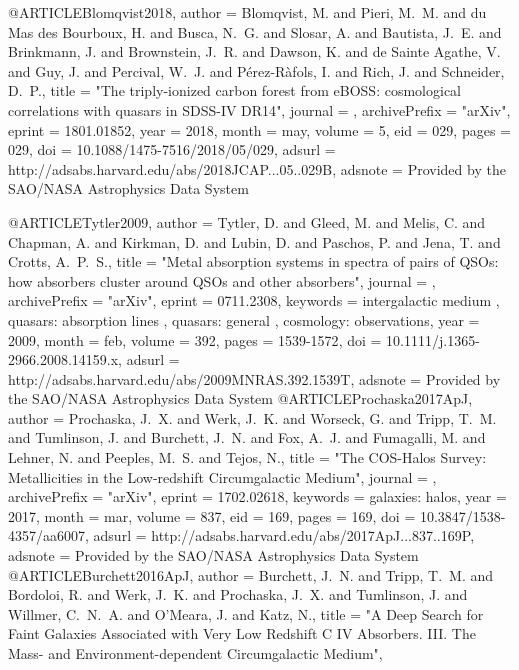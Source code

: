 \documentclass{aa}
\begin{document}
{{{{{{{{{{{{{{@ARTICLE{Blomqvist2018,
   author = {{Blomqvist}, M. and {Pieri}, M.~M. and {du Mas des Bourboux}, H. and 
	{Busca}, N.~G. and {Slosar}, A. and {Bautista}, J.~E. and {Brinkmann}, J. and 
	{Brownstein}, J.~R. and {Dawson}, K. and {de Sainte Agathe}, V. and 
	{Guy}, J. and {Percival}, W.~J. and {P{\'e}rez-R{\`a}fols}, I. and 
	{Rich}, J. and {Schneider}, D.~P.},
    title = "{The triply-ionized carbon forest from eBOSS: cosmological correlations with quasars in SDSS-IV DR14}",
  journal = {\jcap},
archivePrefix = "arXiv",
   eprint = {1801.01852},
     year = 2018,
    month = may,
   volume = 5,
      eid = {029},
    pages = {029},
      doi = {10.1088/1475-7516/2018/05/029},
   adsurl = {http://adsabs.harvard.edu/abs/2018JCAP...05..029B},
  adsnote = {Provided by the SAO/NASA Astrophysics Data System}
}

@ARTICLE{Tytler2009,
   author = {{Tytler}, D. and {Gleed}, M. and {Melis}, C. and {Chapman}, A. and 
	{Kirkman}, D. and {Lubin}, D. and {Paschos}, P. and {Jena}, T. and 
	{Crotts}, A.~P.~S.},
    title = "{Metal absorption systems in spectra of pairs of QSOs: how absorbers cluster around QSOs and other absorbers}",
  journal = {\mnras},
archivePrefix = "arXiv",
   eprint = {0711.2308},
 keywords = {intergalactic medium , quasars: absorption lines , quasars: general , cosmology: observations},
     year = 2009,
    month = feb,
   volume = 392,
    pages = {1539-1572},
      doi = {10.1111/j.1365-2966.2008.14159.x},
   adsurl = {http://adsabs.harvard.edu/abs/2009MNRAS.392.1539T},
  adsnote = {Provided by the SAO/NASA Astrophysics Data System}
}
@ARTICLE{Prochaska2017ApJ,
   author = {{Prochaska}, J.~X. and {Werk}, J.~K. and {Worseck}, G. and {Tripp}, T.~M. and 
	{Tumlinson}, J. and {Burchett}, J.~N. and {Fox}, A.~J. and {Fumagalli}, M. and 
	{Lehner}, N. and {Peeples}, M.~S. and {Tejos}, N.},
    title = "{The COS-Halos Survey: Metallicities in the Low-redshift Circumgalactic Medium}",
  journal = {\apj},
archivePrefix = "arXiv",
   eprint = {1702.02618},
 keywords = {galaxies: halos},
     year = 2017,
    month = mar,
   volume = 837,
      eid = {169},
    pages = {169},
      doi = {10.3847/1538-4357/aa6007},
   adsurl = {http://adsabs.harvard.edu/abs/2017ApJ...837..169P},
  adsnote = {Provided by the SAO/NASA Astrophysics Data System}
}
@ARTICLE{Burchett2016ApJ,
   author = {{Burchett}, J.~N. and {Tripp}, T.~M. and {Bordoloi}, R. and 
	{Werk}, J.~K. and {Prochaska}, J.~X. and {Tumlinson}, J. and 
	{Willmer}, C.~N.~A. and {O'Meara}, J. and {Katz}, N.},
    title = "{A Deep Search for Faint Galaxies Associated with Very Low Redshift C IV Absorbers. III. The Mass- and Environment-dependent Circumgalactic Medium}",
}}}}}}}}}}}}}}}
\end{document}
